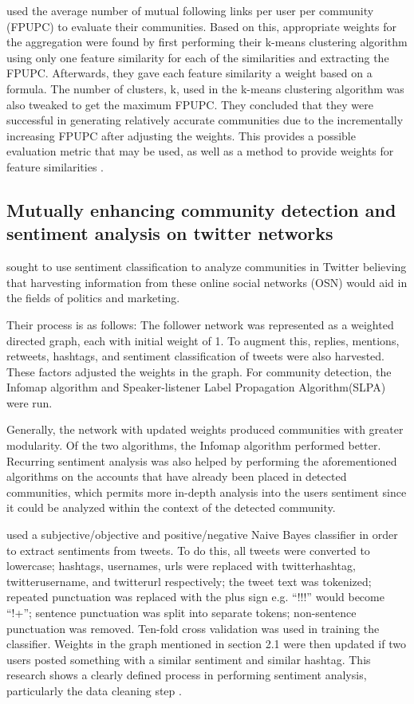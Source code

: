  used the average number of mutual following links per user per community (FPUPC) to evaluate their communities. Based on this, appropriate weights for the aggregation were found by first performing their k-means clustering algorithm using only one feature similarity for each of the similarities and extracting the FPUPC. Afterwards, they gave each feature similarity a weight based on a formula. The number of clusters, k, used in the k-means clustering algorithm was also tweaked to get the maximum FPUPC. They concluded that they were successful in generating relatively accurate communities due to the incrementally increasing FPUPC after adjusting the weights. This provides a possible evaluation metric that may be used, as well as a method to provide weights for feature similarities \cite{Zhang:2012}.


\subsection{Mutually enhancing community detection and sentiment analysis on twitter networks}


 sought to use sentiment classification to analyze communities in Twitter believing that harvesting information from these online social networks (OSN) would aid in the fields of politics and marketing. 


Their process is as follows: The follower network was represented as a weighted directed graph, each with initial weight of 1. To augment this, replies, mentions, retweets, hashtags, and sentiment classification of tweets were also harvested. These factors adjusted the weights in the graph. For community detection, the Infomap algorithm and Speaker-listener Label Propagation Algorithm(SLPA) were run. 


Generally, the network with updated weights produced communities with greater modularity. Of the two algorithms, the Infomap algorithm performed better. Recurring sentiment analysis was also helped by performing the aforementioned algorithms on the accounts that have already been placed in detected communities, which permits more in-depth analysis into the user\vtick s sentiment since it could be analyzed within the context of the detected community.


 used a subjective/objective and positive/negative Naive Bayes classifier in order to extract sentiments from tweets. To do this, all tweets were converted to lowercase; hashtags, usernames, urls were replaced with twitterhashtag, twitterusername, and twitterurl respectively; the tweet text was tokenized; repeated punctuation was replaced with the plus sign e.g. ``!!!'' would become ``!+''; sentence punctuation was split into separate tokens; non-sentence punctuation was removed. Ten-fold cross validation was used in training the classifier. Weights in the graph mentioned in section 2.1 were then updated if two users posted something with a similar sentiment and similar hashtag. This research shows a clearly defined process in performing sentiment analysis, particularly the data cleaning step \cite{Deitrick:2013}.


